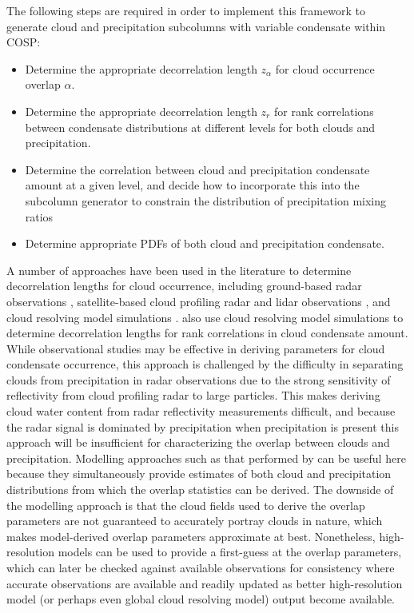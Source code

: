 \documentclass[letter]{article}
\begin{document}
The following steps are required in order to implement this framework to generate cloud and precipitation subcolumns with variable condensate within COSP:
\begin{itemize}
    \item Determine the appropriate decorrelation length $z_{\alpha}$ for cloud occurrence overlap $\alpha$.
    \item Determine the appropriate decorrelation length $z_r$ for rank correlations between condensate distributions at different levels for both clouds and precipitation.
    \item Determine the correlation between cloud and precipitation condensate amount at a given level, and decide how to incorporate this into the subcolumn generator to constrain the distribution of precipitation mixing ratios
    \item Determine appropriate PDFs of both cloud and precipitation condensate.
\end{itemize}

A number of approaches have been used in the literature to determine decorrelation lengths for cloud occurrence, including ground-based radar observations \citep{hogan_and_illingworth_2000}, satellite-based cloud profiling radar and lidar observations \citep{barker_2008,oreopoulos_et_al_2012}, and cloud resolving model simulations \citep{raisanen_et_al_2004,pincus_et_al_2005}. \cite{pincus_et_al_2005} also use cloud resolving model simulations to determine decorrelation lengths for rank correlations in cloud condensate amount. While observational studies may be effective in deriving parameters for cloud condensate occurrence, this approach is challenged by the difficulty in separating clouds from precipitation in radar observations due to the strong sensitivity of reflectivity from cloud profiling radar to large particles. This makes deriving cloud water content from radar reflectivity measurements difficult, and because the radar signal is dominated by precipitation when precipitation is present this approach will be insufficient for characterizing the overlap between clouds and precipitation. Modelling approaches such as that performed by \cite{pincus_et_al_2005} can be useful here because they simultaneously provide estimates of both cloud and precipitation distributions from which the overlap statistics can be derived. The downside of the modelling approach is that the cloud fields used to derive the overlap parameters are not guaranteed to accurately portray clouds in nature, which makes model-derived overlap parameters approximate at best. Nonetheless, high-resolution models can be used to provide a first-guess at the overlap parameters, which can later be checked against available observations for consistency where accurate observations are available and readily updated as better high-resolution model (or perhaps even global cloud resolving model) output become available.
\end{document}
